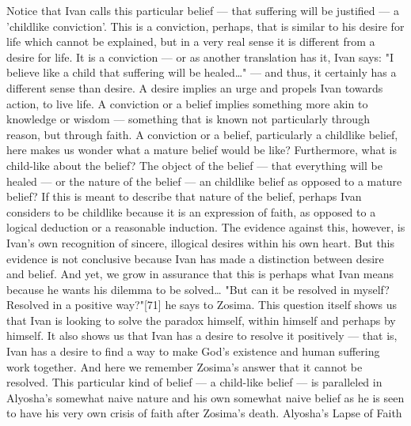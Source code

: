 Notice that Ivan calls this particular belief — that suffering will be justified — a 'childlike conviction'. This is a conviction, perhaps, that is similar to his desire for life which cannot be explained, but in a very real sense it is different from a desire for life. It is a conviction — or as another translation has it, Ivan says: "I believe like a child that suffering will be healed…" — and thus, it certainly has a different sense than desire. A desire implies an urge and propels Ivan towards action, to live life. A conviction or a belief implies something more akin to knowledge or wisdom — something that is known not particularly through reason, but through faith. A conviction or a belief, particularly a childlike belief, here makes us wonder what a mature belief would be like? Furthermore, what is child-like about the belief? The object of the belief — that everything will be healed — or the nature of the belief — an childlike belief as opposed to a mature belief?
If this is meant to describe that nature of the belief, perhaps Ivan considers to be childlike because it is an expression of faith, as opposed to a logical deduction or a reasonable induction. The evidence against this, however, is Ivan's own recognition of sincere, illogical desires within his own heart. But this evidence is not conclusive because Ivan has made a distinction between desire and belief. And yet, we grow in assurance that this is perhaps what Ivan means because he wants his dilemma to be solved… "But can it be resolved in myself? Resolved in a positive way?"[71] he says to Zosima. This question itself shows us that Ivan is looking to solve the paradox himself, within himself and perhaps by himself. It also shows us that Ivan has a desire to resolve it positively — that is, Ivan has a desire to find a way to make God's existence and human suffering work together. And here we remember Zosima's answer that it cannot be resolved. This particular kind of belief — a child-like belief — is paralleled in Alyosha's somewhat naive nature and his own somewhat naive belief as he is seen to have his very own crisis of faith after Zosima's death.
Alyosha’s Lapse of Faith
